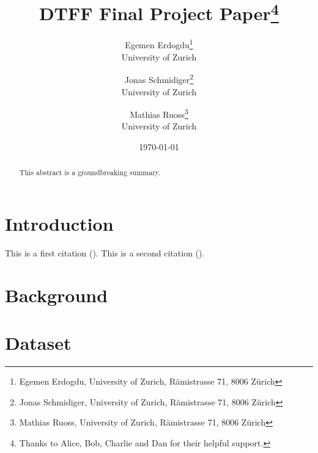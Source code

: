 \documentclass{article}
\title{DTFF Final Project Paper\thanks{Thanks to Alice, Bob, Charlie and Dan for their helpful support.}}
\author{Egemen Erdogdu\thanks{Egemen Erdogdu, University of Zurich, Rämistrasse 71, 8006 Zürich} \\ University of Zurich \and Jonas Schmidiger\thanks{Jonas Schmidiger, University of Zurich, Rämistrasse 71, 8006 Zürich} \\ University of Zurich \and Mathias Ruoss\thanks{Mathias Ruoss, University of Zurich, Rämistrasse 71, 8006 Zürich}\\ University of Zurich}
\date{\today}
\begin{document}
\maketitle
\begin{abstract}
    This abstract is a groundbreaking summary.
    \blindtext
\end{abstract}



\newpage
\tableofcontents
\newpage

\section{Introduction}
\blindtext[2]



This is a first citation (\cite{Kozlowski2020}). This is a second citation (\cite{Gormsen2020}).

\section{Background}
\blindtext[2]

\section{Dataset}
\blindtext[2]
\end{document}
